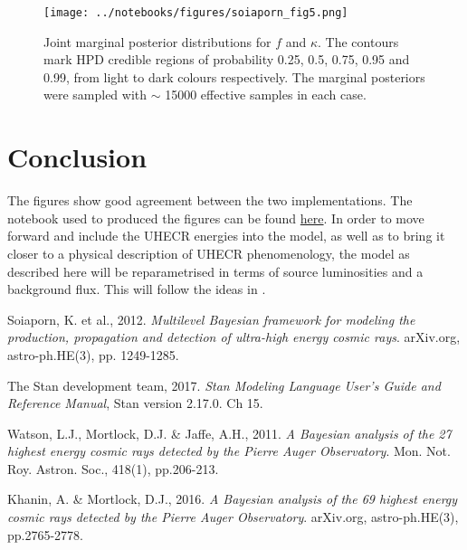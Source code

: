 \documentclass[fontsize=12pt]{article}
\begin{document}
\begin{figure}[h]
\centering
\texttt{[image: ../notebooks/figures/soiaporn\_fig5.png]}
\caption{Joint marginal posterior distributions for $f$ and $\kappa$. The contours mark HPD credible regions of probability 0.25, 0.5, 0.75, 0.95 and 0.99, from light to dark colours respectively. The marginal posteriors were sampled with $\sim$ 15000 effective samples in each case.}
\end{figure}

\section{Conclusion}

The figures show good agreement between the two implementations. The notebook used to produced the figures can be found \href{https://github.com/cescalara/uhecr_model/blob/master/notebooks/auger2010_study.ipynb}{here}. In order to move forward and include the UHECR energies into the model, as well as to bring it closer to a physical description of UHECR phenomenology, the model as described here will be reparametrised in terms of source luminosities and a background flux. This will follow the ideas in \cite{watson, khanin}.

\begin{thebibliography}{9}

Soiaporn, K. et al., 2012. \emph{Multilevel Bayesian framework for modeling the production, propagation and detection of ultra-high energy cosmic rays}. arXiv.org, astro-ph.HE(3), pp. 1249-1285.

The Stan development team, 2017. \emph{Stan Modeling Language User's Guide and Reference Manual}, Stan version 2.17.0. Ch 15.

Watson, L.J., Mortlock, D.J. \& Jaffe, A.H., 2011. \emph{A Bayesian analysis of the 27 highest energy cosmic rays detected by the Pierre Auger Observatory}. Mon. Not. Roy. Astron. Soc., 418(1), pp.206-213.

Khanin, A. \& Mortlock, D.J., 2016. \emph{A Bayesian analysis of the 69 highest energy cosmic rays detected by the Pierre Auger Observatory}. arXiv.org, astro-ph.HE(3), pp.2765-2778.

\end{thebibliography}
\end{document}
